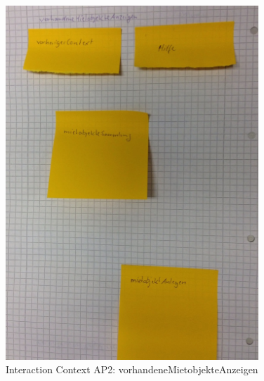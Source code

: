 \begin{figure}[H]
\centering
\includegraphics[angle=90, width=0.85\textwidth]  {./images/abstract/version2/vorhandeneMietobjekteAnzeigen.JPG}
\caption{Interaction Context AP2: vorhandeneMietobjekteAnzeigen}
\label{interfaceContents51}
\end{figure}


